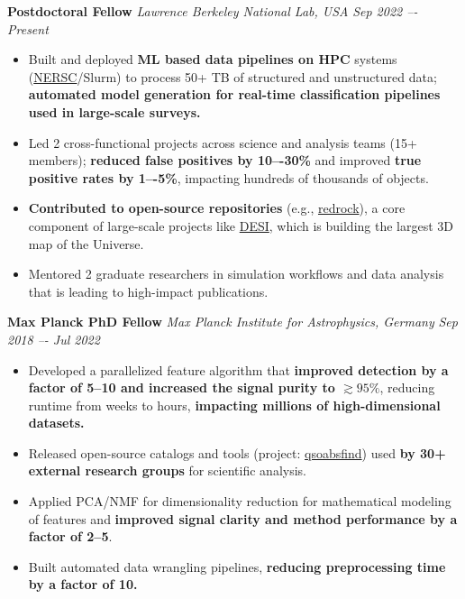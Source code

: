 \documentclass[a4paper,10pt]{article}
\begin{document}
\textcolor{sectionblue}{\textbf{Postdoctoral Fellow }} \hfill \textcolor{sectionblue}{\textit{Lawrence Berkeley National Lab, USA}} \hfill \textcolor{sectionblue}{\textit{Sep 2022 –- Present}}
\begin{itemize}
    \item Built and deployed \textbf{ML based data pipelines on HPC} systems (\href{https://www.nersc.gov/}{NERSC}/Slurm) to process 50+ TB of structured and unstructured data; \textbf{automated model generation for real-time classification pipelines used in large-scale surveys.}
    \vspace*{-1mm}
    \item Led 2 cross-functional projects across science and analysis teams (15+ members); \textbf{reduced false positives by 10–-30\%} and improved \textbf{true positive rates by 1–-5\%}, impacting hundreds of thousands of objects.
    \vspace*{-1mm}
     \item \textbf{Contributed to open-source repositories} (e.g., \href{https://github.com/desihub/redrock}{redrock}), a core component of large-scale projects like \href{https://en.wikipedia.org/wiki/Dark_Energy_Spectroscopic_Instrument}{DESI}, which is building the largest 3D map of the Universe.
    \vspace*{-1mm}
    \item Mentored 2 graduate researchers in simulation workflows and data analysis that is leading to high-impact publications.
    
\end{itemize}
    
\vspace{2mm}
\textcolor{sectionblue}{\textbf{Max Planck PhD Fellow}} \hfill \textcolor{sectionblue}{\textit{Max Planck Institute for Astrophysics, Germany}} \hfill \textcolor{sectionblue}{\textit{Sep 2018 –- Jul 2022}}

\begin{itemize}

    \item Developed a parallelized feature algorithm that \textbf{improved detection by a factor of 5--10 and increased the signal purity to $\gtrsim 95\%$}, reducing runtime from weeks to hours, \textbf{impacting millions of high-dimensional datasets.}
    \vspace*{-1mm}
    \item Released open-source catalogs and tools (project: \href{https://github.com/abhi0395/qsoabsfind}{qsoabsfind}) used \textbf{by 30+ external research groups} for scientific analysis.
    \vspace*{-1mm}
    \item Applied PCA/NMF for dimensionality reduction for mathematical modeling of features and \textbf{improved signal clarity and method performance by a factor of 2--5}.
    \vspace*{-1mm}
  \item Built automated data wrangling pipelines, \textbf{reducing preprocessing time by a factor of 10.}
    
\end{itemize}
\end{document}
